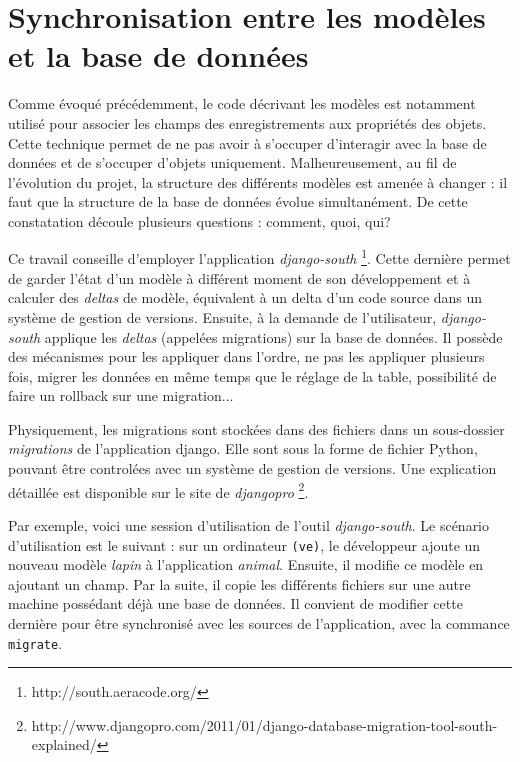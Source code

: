 \documentclass[a4paper,12pt]{article}
\begin{document}
\section{Synchronisation entre les modèles et la base de données}

Comme évoqué précédemment, le code décrivant les
modèles est notamment utilisé pour associer les champs des enregistrements
aux propriétés des objets. Cette technique permet de ne pas avoir
à s'occuper d'interagir avec la base de données et de s'occuper d'objets uniquement.
Malheureusement, au fil de l'évolution du projet, la structure des différents modèles
est amenée à changer : il faut que la structure de la base de données évolue simultanément.
De cette constatation découle plusieurs questions : comment, quoi, qui?

Ce travail conseille d'employer l'application \textit{django-south}
\footnote{http://south.aeracode.org/}. Cette dernière permet de garder l'état d'un modèle
à différent moment de son développement et à calculer des \textit{deltas} de modèle, équivalent
à un delta d'un code source dans un système de gestion de versions. Ensuite,
à la demande de l'utilisateur, \textit{django-south} applique les \textit{deltas}
(appelées migrations) sur la base de données. Il possède des mécanismes pour les
appliquer dans l'ordre, ne pas les appliquer plusieurs fois, migrer les
données en même temps que le réglage de la table, possibilité de faire un rollback
sur une migration...

Physiquement, les migrations sont stockées dans des fichiers dans un sous-dossier
\textit{migrations} de l'application django. Elle sont sous la forme de fichier
Python, pouvant être controlées avec un système de gestion de versions. Une explication
détaillée est disponible sur le site de \textit{djangopro}
\footnote{http://www.djangopro.com/2011/01/django-database-migration-tool-south-explained/}.

Par exemple, voici une session d'utilisation de l'outil \textit{django-south}.
Le scénario d'utilisation est le suivant : sur un ordinateur \texttt{(ve)}, le développeur
ajoute un nouveau modèle \textit{lapin} à l'application \textit{animal}. Ensuite,
il modifie ce modèle en ajoutant un champ. Par la suite, il copie les différents
fichiers sur une autre machine possédant déjà une base de données. Il convient de
modifier cette dernière pour être synchronisé avec les sources de l'application,
avec la commance \texttt{migrate}.
\end{document}
